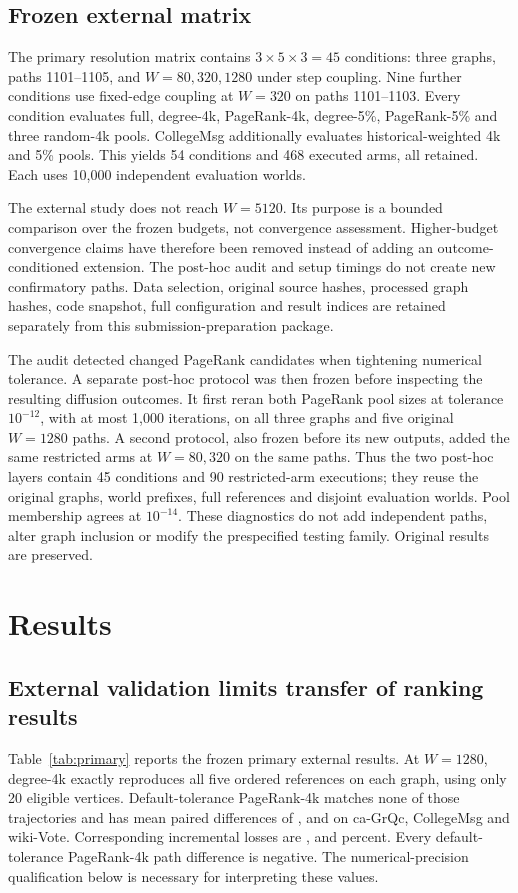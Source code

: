 \documentclass[smallextended]{svjour3}
\begin{document}
\subsection{Frozen external matrix}
The primary resolution matrix contains $3\times5\times3=45$ conditions: three graphs, paths 1101--1105, and $W=80,320,1280$ under step coupling. Nine further conditions use fixed-edge coupling at $W=320$ on paths 1101--1103. Every condition evaluates full, degree-4k, PageRank-4k, degree-5\%, PageRank-5\% and three random-4k pools. CollegeMsg additionally evaluates historical-weighted 4k and 5\% pools. This yields 54 conditions and 468 executed arms, all retained. Each uses 10,000 independent evaluation worlds.

The external study does not reach $W=5120$. Its purpose is a bounded comparison over the frozen budgets, not convergence assessment. Higher-budget convergence claims have therefore been removed instead of adding an outcome-conditioned extension. The post-hoc audit and setup timings do not create new confirmatory paths. Data selection, original source hashes, processed graph hashes, code snapshot, full configuration and result indices are retained separately from this submission-preparation package.

The audit detected changed PageRank candidates when tightening numerical tolerance. A separate post-hoc protocol was then frozen before inspecting the resulting diffusion outcomes. It first reran both PageRank pool sizes at tolerance $10^{-12}$, with at most 1,000 iterations, on all three graphs and five original $W=1280$ paths. A second protocol, also frozen before its new outputs, added the same restricted arms at $W=80,320$ on the same paths. Thus the two post-hoc layers contain 45 conditions and 90 restricted-arm executions; they reuse the original graphs, world prefixes, full references and disjoint evaluation worlds. Pool membership agrees at $10^{-14}$. These diagnostics do not add independent paths, alter graph inclusion or modify the prespecified testing family. Original results are preserved.

\section{Results}
\subsection{External validation limits transfer of ranking results}
Table~\ref{tab:primary} reports the frozen primary external results. At $W=1280$, degree-4k exactly reproduces all five ordered references on each graph, using only 20 eligible vertices. Default-tolerance PageRank-4k matches none of those trajectories and has mean paired differences of \GrqcPRDelta{}, \CollegePRDelta{} and \WikiPRDelta{} on ca-GrQc, CollegeMsg and wiki-Vote. Corresponding incremental losses are \GrqcPRLoss{}, \CollegePRLoss{} and \WikiPRLoss{} percent. Every default-tolerance PageRank-4k path difference is negative. The numerical-precision qualification below is necessary for interpreting these values.

\end{document}
